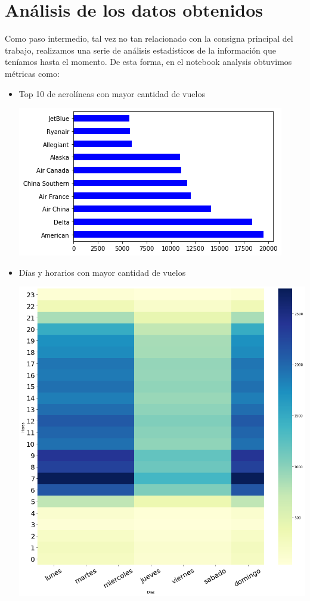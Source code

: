 \documentclass[a4paper,11pt]{article}
\begin{document}
\section{Análisis de los datos obtenidos}
Como paso intermedio, tal vez no tan relacionado con la consigna principal del trabajo, realizamos una serie de análisis estadísticos de la información que teníamos hasta el momento.
De esta forma, en el notebook analysis obtuvimos métricas como:
\begin{itemize}
\item Top 10 de aerolíneas con mayor cantidad de vuelos
\begin{center}
\includegraphics[scale=0.60]{./imagenes/aerolineas_top10.png}
\end{center}
\newpage
\item Días y horarios con mayor cantidad de vuelos
\begin{center}
\includegraphics[scale=0.35]{./imagenes/heatmap.png}

\end{center}
\end{itemize}
\end{document}
